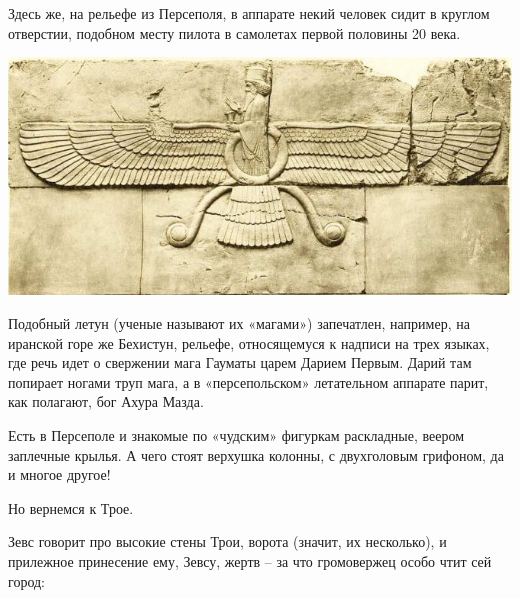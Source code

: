 Здесь же, на рельефе из Персеполя, в аппарате некий человек сидит в круглом отверстии, подобном месту пилота в самолетах первой половины 20 века. 

\begin{center}
\includegraphics[width=\textwidth]{chast-troya/gomer/percepol-03-chast.jpg}
\end{center}

Подобный летун (ученые называют их «магами») запечатлен, например, на иранской горе же Бехистун, рельефе, относящемуся к надписи на трех языках, где речь идет о свержении мага Гауматы царем Дарием Первым. Дарий там попирает ногами труп мага, а в «персепольском» летательном аппарате парит, как полагают, бог Ахура Мазда.  



Есть в Персеполе и знакомые по «чудским» фигуркам раскладные, веером заплечные крылья. А чего стоят верхушка колонны, с двухголовым грифоном, да и многое другое! 


Но вернемся к Трое.

Зевс говорит про высокие стены Трои, ворота (значит, их несколько), и прилежное принесение ему, Зевсу, жертв – за что громовержец особо чтит сей город:\\

